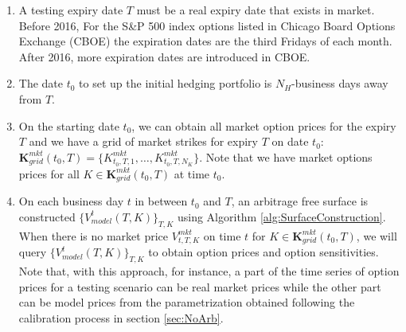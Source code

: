 \documentclass[letterpaper,12pt,titlepage,oneside,final]{book}
\numberwithin{equation}{section}
\theoremstyle{definition}
\newcommand{\Vmkt}{V^{mkt}}
\begin{document}
\begin{enumerate}
	\item A testing expiry date $T$ must be a real expiry date that exists in market. Before 2016, For the S\&P 500 index options listed in Chicago Board Options Exchange (CBOE) the expiration dates are the third Fridays of each month. After 2016, more expiration dates are introduced in CBOE.
	\item The date $t_0$ to set up the initial hedging portfolio is  $N_H$-business days away from $T$.
	\item On the starting date $t_0$, we can obtain all market option prices for the expiry  $T$ and we have a grid of market strikes for expiry $T$ on date $t_0$:
	$\mathbf{K}^{mkt}_{grid}(t _0,T)=\{	K^{mkt}_{t_0,T,1},\dots,K^{mkt}_{t_0,T,N_K}\}$. Note that we have market options  prices for all $K \in \mathbf{K}^{mkt}_{grid}(t _0,T)$ at time $t_0$.
	\item On each business day $t$ in between $t _0$ and $T$, an arbitrage free surface is constructed $\{V^{t}_{model}(T,K)\}_{T,K}$ using Algorithm \ref{alg:SurfaceConstruction}. 
	When there is no  market price $V^{mkt}_{t,T,K}$ on time $t$ for $K \in \mathbf{K}^{mkt}_{grid}(t _0,T)$, we will query $\{V^{t}_{model}(T,K)\}_{T,K}$ to obtain  option prices and option sensitivities.  Note that, with this approach, for instance, a part  of the time series of option prices for a testing scenario can be real market prices while the other part can be model prices from the  parametrization  obtained following the calibration process in section \ref{sec:NoArb}.

\end{enumerate}
\end{document}
